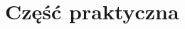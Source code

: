 \documentclass[12pt]{mwbk}
\theoremstyle{plain}
\theoremstyle{definition}
\theoremstyle{remark}
\newcommand\zrodlo[1]{\par\vspace{-3mm}{\small\textit{Źródło: }#1 }}
\begin{document}
\chapter{Część praktyczna}






\end{document}
